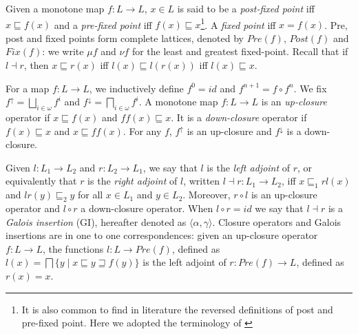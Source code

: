 \documentclass{llncs}
\begin{document}
Given a monotone map $f\colon L\to L$, $x\in L$ is said to be a \emph{post-fixed point} iff  $x\sqsubseteq f(x)$ and a \emph{pre-fixed point} iff $f(x)\sqsubseteq x$\footnote{It is also common to find in literature the reversed definitions of post and pre-fixed point. Here we adopted the terminology of \cite{davey_priestley_2002}}. A \emph{fixed point} iff $x=f(x)$. Pre, post and fixed points form complete lattices, denoted by $Pre(f)$, $Post(f)$ and $Fix(f)$: we write $\mu f$ and $\nu f$ for the least and greatest fixed-point. Recall that if $l\dashv r$, then $x\sqsubseteq r(x)$ iff $l(x)\sqsubseteq l(r(x))$ iff $l(x)\sqsubseteq x$. %

For a map $f\colon L \to L$, we inductively define $f^0=id$ and $f^{n+1}=f\circ f^n$. We fix $f^\uparrow = \bigsqcup_{i\in \omega} f^i$ and $f^\downarrow = \bigsqcap_{i\in \omega} f^i$. A monotone map $f\colon L \to L$ is an \emph{up-closure} operator if $x\sqsubseteq f(x)$ and $ff(x) \sqsubseteq x$. It is a \emph{down-closure} operator if $f(x)\sqsubseteq x$ and $x \sqsubseteq ff(x)$. For any $f$, $f^\uparrow$ is an up-closure and $f^\downarrow$ is a down-closure. 

Given $l \colon L_1 \to L_2$ and $r\colon L_2\to L_1$, we say that $l$ is the \emph{left adjoint} of $r$, or equivalently that $r$ is the \emph{right adjoint} of $l$, written $l\dashv r \colon L_1\to L_2$, iff $x\sqsubseteq_1 rl(x)$ and $lr(y) \sqsubseteq_2 y$ for all $x\in L_1$ and $y\in L_2$. Moreover, $r\circ l$ is an up-closure operator and $l\circ r$ a down-closure operator. When $l\circ r=id$ we say that $l\dashv r$ is a \emph{Galois insertion} (GI), hereafter denoted as $\langle \alpha,\gamma \rangle$.
Closure operators and Galois insertions are in one to one correspondences: given an up-closure operator $f\colon L\to L$, the functions $l\colon L \to Pre(f)$, defined as $l(x) = \bigsqcap \{y \mid x\sqsubseteq y \sqsupseteq f(y) \}$ is the left adjoint of $r\colon Pre(f) \to L$, defined as $r(x)=x$.




\medskip
\end{document}

